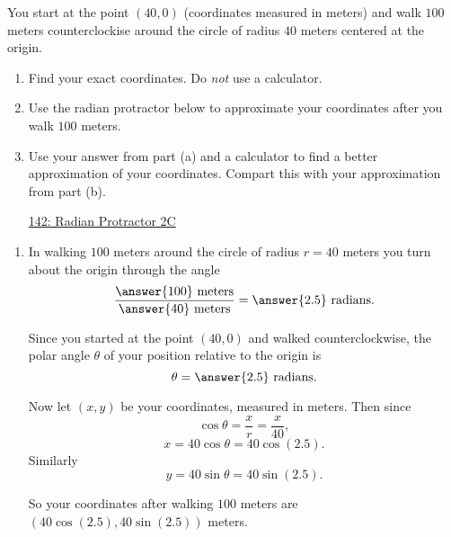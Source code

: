 \documentclass{ximera}
\begin{document}
\begin{example}  \label{Exp8948394444}

You start at the point $(40,0)$ (coordinates measured in meters) and walk $100$ meters counterclockise around the circle of radius $40$ meters centered at the origin.

\begin{enumerate}

\item Find your exact coordinates. Do \emph{not} use a calculator.

\item Use the radian protractor below to approximate your coordinates after you walk $100$ meters.
 
\item Use your answer from part (a) and a calculator to find a better approximation of your coordinates. Compart this with your approximation from part (b).

\begin{onlineOnly}
    \begin{center}
\end{center}
\end{onlineOnly}

\href{https://www.desmos.com/calculator/lbkveixdno}{142: Radian Protractor 2C}

\end{enumerate}

\begin{explanation}

\begin{enumerate}
\item In walking $100$ meters around the circle of radius $r = 40$ meters you turn about the origin through the angle
\[
   \frac{\answer{100}\text{ meters}}{\answer{40}\text{ meters}} = \answer{2.5}\text{ radians} .
\]

Since  you started at the point $(40,0)$ and walked counterclockwise, the polar angle $\theta$ of your position relative to the origin is
\[
 \theta =  \answer{2.5} \text{ radians} .
\]

Now let $(x,y)$ be your coordinates, measured in meters. Then since
\[
 \cos \theta = \frac{x}{r} = \frac{x}{40} ,  %
\]
\[
  x = 40 \cos\theta = 40 \cos (2.5) .
\]
Similarly
\[
   y = 40 \sin\theta = 40 \sin (2.5) .
\]

So your coordinates after walking $100$ meters are $(40 \cos (2.5) , 40\sin(2.5))$ meters.


\end{enumerate}
\end{explanation}
\end{example}
\end{document}
